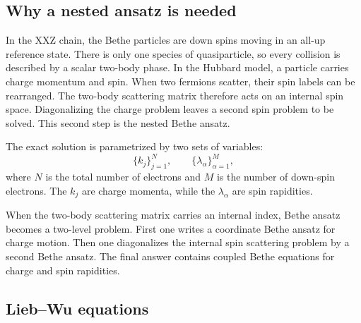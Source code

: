 \subsection{Why a nested ansatz is needed}
\label{subsec:further-why-nested}

In the XXZ chain, the Bethe particles are down spins moving in an all-up
reference state.  There is only one species of quasiparticle, so every collision
is described by a scalar two-body phase.  In the Hubbard model, a particle
carries charge momentum and spin.  When two fermions scatter, their spin labels
can be rearranged.  The two-body scattering matrix therefore acts on an internal
spin space.  Diagonalizing the charge problem leaves a second spin problem to be
solved.  This second step is the nested Bethe ansatz.

The exact solution is parametrized by two sets of variables:
\begin{equation}
\label{eq:further-hubbard-variables}
    \{k_j\}_{j=1}^{N},
    \qquad
    \{\lambda_\alpha\}_{\alpha=1}^{M},
\end{equation}
where $N$ is the total number of electrons and $M$ is the number of down-spin
electrons.  The $k_j$ are charge momenta, while the $\lambda_\alpha$ are spin
rapidities.

\begin{principle}
When the two-body scattering matrix carries an internal index, Bethe ansatz
becomes a two-level problem.  First one writes a coordinate Bethe ansatz for
charge motion.  Then one diagonalizes the internal spin scattering problem by a
second Bethe ansatz.  The final answer contains coupled Bethe equations for
charge and spin rapidities.
\end{principle}

\subsection{Lieb--Wu equations}
\label{subsec:further-lieb-wu-equations}

